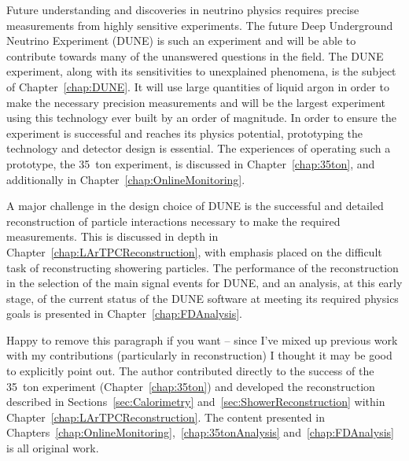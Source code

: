 Future understanding and discoveries in neutrino physics requires precise measurements from highly sensitive experiments.  The future Deep Underground Neutrino Experiment (DUNE) is such an experiment and will be able to contribute towards many of the unanswered questions in the field.  The DUNE experiment, along with its sensitivities to unexplained phenomena, is the subject of Chapter~\ref{chap:DUNE}.  It will use large quantities of liquid argon in order to make the necessary precision measurements and will be the largest experiment using this technology ever built by an order of magnitude.  In order to ensure the experiment is successful and reaches its physics potential, prototyping the technology and detector design is essential.  The experiences of operating such a prototype, the 35~ton experiment, is discussed in Chapter~\ref{chap:35ton}, and additionally in Chapter~\ref{chap:OnlineMonitoring}.

A major challenge in the design choice of DUNE is the successful and detailed reconstruction of particle interactions necessary to make the required measurements.  This is discussed in depth in Chapter~\ref{chap:LArTPCReconstruction}, with emphasis placed on the difficult task of reconstructing showering particles.  The performance of the reconstruction in the selection of the main signal events for DUNE, and an analysis, at this early stage, of the current status of the DUNE software at meeting its required physics goals is presented in Chapter~\ref{chap:FDAnalysis}.

{\color{red}Happy to remove this paragraph if you want -- since I've mixed up previous work with my contributions (particularly in reconstruction) I thought it may be good to explicitly point out.} The author contributed directly to the success of the 35~ton experiment (Chapter~\ref{chap:35ton}) and developed the reconstruction described in Sections~\ref{sec:Calorimetry} and~\ref{sec:ShowerReconstruction} within Chapter~\ref{chap:LArTPCReconstruction}.  The content presented in Chapters~\ref{chap:OnlineMonitoring},~\ref{chap:35tonAnalysis} and~\ref{chap:FDAnalysis} is all original work.
